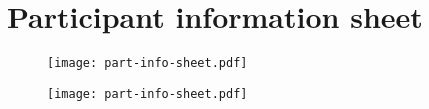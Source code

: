 
\chapter{Participant information sheet}
\label{appendixg}

\begin{figure}[htbp]
\centerline{\texttt{[image: part-info-sheet.pdf]}}
\label{partinfosheet1}
\end{figure}

\newpage

\begin{figure}[htbp]
\centerline{\texttt{[image: part-info-sheet.pdf]}}
\label{partinfosheet2}
\end{figure}
